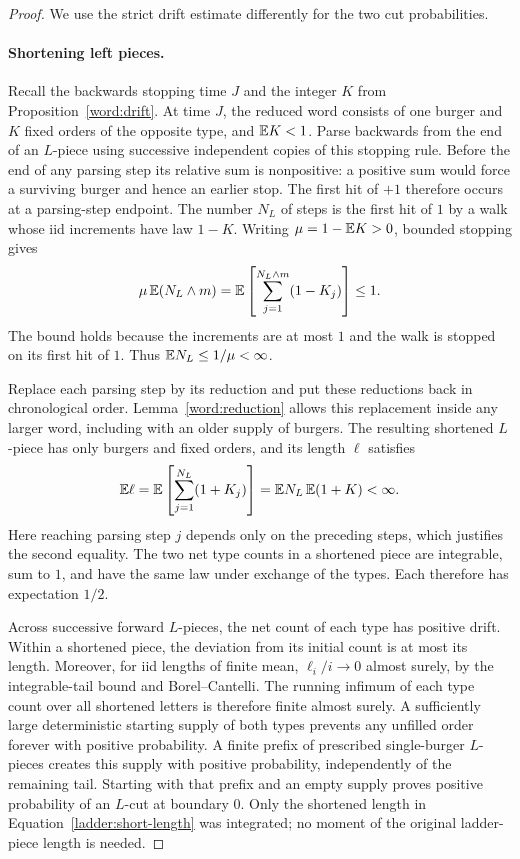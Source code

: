 \begin{proof}
We use the strict drift estimate differently for the two cut probabilities.

\paragraph{Shortening left pieces.}
Recall the backwards stopping time $J$ and the integer $K$ from
Proposition~\ref{word:drift}.
At time $J$, the reduced word consists of one burger and $K$ fixed orders
of the opposite type, and $\mathbb E K<1$.
Parse backwards from the end of an $L$-piece using successive independent
copies of this stopping rule.
Before the end of any parsing step its relative sum is nonpositive:
a positive sum would force a surviving burger and hence an earlier stop.
The first hit of $+1$ therefore occurs at a parsing-step endpoint.
The number $N_L$ of steps is the first hit of $1$ by a walk whose iid
increments have law $1-K$.
Writing $\mu=1-\mathbb E K>0$, bounded stopping gives
\[
 \mu\,\mathbb E(N_L\wedge m)
   =\mathbb E\left[\sum_{j=1}^{N_L\wedge m}(1-K_j)\right]\le1.
\]
The bound holds because the increments are at most $1$ and the walk is
stopped on its first hit of $1$.
Thus $\mathbb E N_L\le1/\mu<\infty$.

Replace each parsing step by its reduction and put these reductions back
in chronological order.
Lemma~\ref{word:reduction} allows this replacement inside any larger word,
including with an older supply of burgers.
The resulting shortened $L$-piece has only burgers and fixed orders,
and its length $\ell$ satisfies
\begin{equation}
 \mathbb E\ell
 =\mathbb E\left[\sum_{j=1}^{N_L}(1+K_j)\right]
 =\mathbb E N_L\,\mathbb E(1+K)<\infty.
 \label{ladder:short-length}
\end{equation}
Here reaching parsing step $j$ depends only on the preceding steps, which
justifies the second equality.
The two net type counts in a shortened piece are integrable, sum to $1$,
and have the same law under exchange of the types.
Each therefore has expectation $1/2$.

Across successive forward $L$-pieces, the net count of each type has
positive drift.
Within a shortened piece, the deviation from its initial count is at most
its length. Moreover, for iid lengths of finite mean, $\ell_i/i\to0$
almost surely, by the integrable-tail bound and Borel--Cantelli.
The running infimum of each type count over all shortened letters is
therefore finite almost surely.
A sufficiently large deterministic starting supply of both types
prevents any unfilled order forever with positive probability.
A finite prefix of prescribed single-burger $L$-pieces creates this supply
with positive probability, independently of the remaining tail.
Starting with that prefix and an empty supply proves positive probability
of an $L$-cut at boundary $0$.
Only the shortened length in Equation~\eqref{ladder:short-length} was
integrated; no moment of the original ladder-piece length is needed.


\end{proof}

